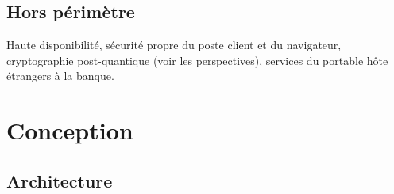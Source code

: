 \documentclass[11pt,a4paper]{article}
\begin{document}
\subsection{Hors périmètre}
Haute disponibilité, sécurité propre du poste client et du navigateur, cryptographie
post-quantique (voir les perspectives), services du portable hôte étrangers à la banque.

\section{Conception}

\subsection{Architecture}
\end{document}
